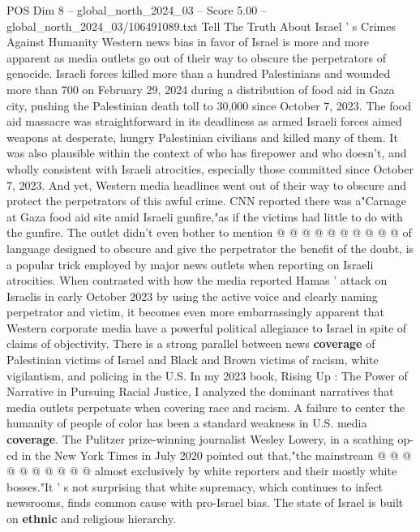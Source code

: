 \begin{textsample}{POS Dim 8 – global\_north\_2024\_03 – Score 5.00 – global\_north\_2024\_03/106491089.txt}  \label{ex:f8_pos_224}
Tell The Truth About Israel ' s Crimes Against Humanity Western news bias in favor of Israel is more and more apparent as media outlets go out of their way to obscure the perpetrators of genocide.
Israeli forces killed more than a hundred Palestinians and wounded more than 700 on February 29, 2024 during a distribution of food aid in Gaza city, pushing the Palestinian death toll to 30,000 since October 7, 2023.
The food aid massacre was straightforward in its deadliness as armed Israeli forces aimed weapons at desperate, hungry Palestinian civilians and killed many of them.
It was also plausible within the context of who has firepower and who doesn't, and wholly consistent with Israeli atrocities, especially those committed since October 7, 2023.
And yet, Western media headlines went out of their way to obscure and protect the perpetrators of this awful crime.
CNN reported there was a"Carnage at Gaza food aid site amid Israeli gunfire,"as if the victims had little to do with the gunfire.
The outlet didn't even bother to mention @ @ @ @ @ @ @ @ @ @ of language designed to obscure and give the perpetrator the benefit of the doubt, is a popular trick employed by major news outlets when reporting on Israeli atrocities.
When contrasted with how the media reported Hamas ' attack on Israelis in early October 2023 by using the active voice and clearly naming perpetrator and victim, it becomes even more embarrassingly apparent that Western corporate media have a powerful political allegiance to Israel in spite of claims of objectivity.
There is a strong parallel between news \textbf{coverage} of Palestinian victims of Israel and Black and Brown victims of racism, white vigilantism, and policing in the U.S.
In my 2023 book, Rising Up : The Power of Narrative in Pursuing Racial Justice, I analyzed the dominant narratives that media outlets perpetuate when covering race and racism.
A failure to center the humanity of people of color has been a standard weakness in U.S. media \textbf{coverage}.
The Pulitzer prize-winning journalist Wesley Lowery, in a scathing op-ed in the New York Times in July 2020 pointed out that,"the mainstream @ @ @ @ @ @ @ @ @ @ almost exclusively by white reporters and their mostly white bosses."It ' s not surprising that white supremacy, which continues to infect newsrooms, finds common cause with pro-Israel bias.
The state of Israel is built on \textbf{ethnic} and religious hierarchy.

\end{textsample}
